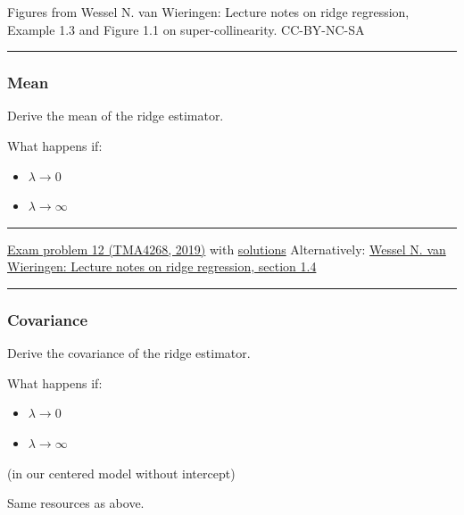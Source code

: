 \documentclass[
  letterpaper,
  DIV=11,
  numbers=noendperiod]{scrartcl}
\providecommand{\tightlist}{%
  \setlength{\itemsep}{0pt}\setlength{\parskip}{0pt}}\usepackage{longtable,booktabs,array}
\begin{document}
Figures from Wessel N. van Wieringen: Lecture notes on ridge regression,
Example 1.3 and Figure 1.1 on super-collinearity. CC-BY-NC-SA

\begin{center}\rule{0.5\linewidth}{0.5pt}\end{center}

\hypertarget{mean}{%
\subsubsection{Mean}\label{mean}}

Derive the mean of the ridge estimator.

What happens if:

\begin{itemize}
\tightlist
\item
  \(\lambda \rightarrow 0\)
\item
  \(\lambda \rightarrow \infty\)
\end{itemize}

\begin{center}\rule{0.5\linewidth}{0.5pt}\end{center}

\href{https://www.math.ntnu.no/emner/TMA4268/Exam/V2019e.pdf}{Exam
problem 12 (TMA4268, 2019)} with
\href{https://www.math.ntnu.no/emner/TMA4268/Exam/e2019sol.html}{solutions}
Alternatively: \href{https://arxiv.org/pdf/1509.09169.pdf}{Wessel N. van
Wieringen: Lecture notes on ridge regression, section 1.4}

\begin{center}\rule{0.5\linewidth}{0.5pt}\end{center}

\hypertarget{covariance}{%
\subsubsection{Covariance}\label{covariance}}

Derive the covariance of the ridge estimator.

What happens if:

\begin{itemize}
\tightlist
\item
  \(\lambda \rightarrow 0\)
\item
  \(\lambda \rightarrow \infty\)
\end{itemize}

(in our centered model without intercept)

Same resources as above.
\end{document}
